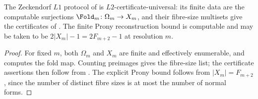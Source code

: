 \begin{proposition}
\label{prop:zeckendorf-cert-univ}
The Zeckendorf \(L1\) protocol of  is
\(L2\)-certificate-universal: its finite data are the computable surjections
\(\Fold_m\colon\Omega_m\to X_m\), and their fibre-size multisets give the
certificates of .  The finite Prony
reconstruction bound is computable and may be taken to be
\(2|X_m|-1=2F_{m+2}-1\) at resolution \(m\).
\end{proposition}

\begin{proof}
For fixed \(m\), both \(\Omega_m\) and \(X_m\) are finite and effectively
enumerable, and  computes the fold map.
Counting preimages gives the fibre-size list; the certificate assertions then
follow from
.  The
explicit Prony bound follows from \(|X_m|=F_{m+2}\), since the number of distinct
fibre sizes is at most the number of normal forms.
\end{proof}

